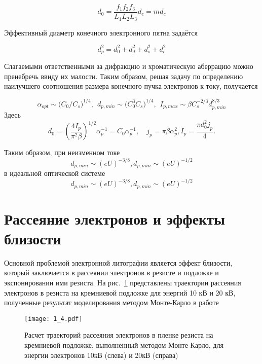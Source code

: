 \begin{equation}
d_0= \frac{f_1 f_2 f_3}{L_1 L_2 L_3} d_c = md_c
\label{eq:A4}
\end{equation}

Эффективный диаметр конечного электронного пятна задаётся

\begin{equation}
d_p^2=d_0^2+d_d^2+d_s^2+d_c^2
\label{eq:A5}
\end{equation}

Слагаемыми ответственными за дифракцию и хроматическую аберрацию можно пренебречь ввиду их малости. Таким образом, решая задачу по определению наилучшего соотношения размера конечного пучка электронов к току, получается

\begin{equation}
\alpha_{opt}\sim{(}C_0/C_s{)}^{1/4},\>\>d_{p,min}\sim{(}C_0^3 C_s{)}^{1/4},\>\> I_{p,max}\sim \beta C_s^{-2/3} d_{p,min}^{8/3}\label{eq:A6}
\end{equation}
Здесь
\[
    d_0= \left(\frac{4I_p}{\pi^2 \beta}\right)^{1/2} \alpha_p^{-1}=C_0\alpha_p^{-1},
    \quad j_p=\pi \beta \alpha_p^2 , I_p= \frac{\pi d_0^2 j_p}{4}.
\]

Таким образом, при неизменном токе
\begin{equation}
d_{p,min}\sim (eU)^{-3/8},d_{p,min}\sim(eU)^{-1/2}
\label{eq:A7}
\end{equation}
в идеальной оптической системе
\begin{equation}
d_{p,min}\sim (eU)^{-3/8},d_{p,min}\sim(eU)^{-1/2}
\end{equation}

\section{Рассеяние электронов и эффекты близости}

Основной проблемой электронной литографии является эффект близости, который заключается в рассеянии электронов в резисте и подложке и экспонировании ими резиста. На рис.~\ref{fig:4} представлены траектории рассеяния электронов в резиста на кремниевой подложке для энергий 10 кВ и 20 кВ, полученные результат моделирования методом Монте-Карло в работе \cite{4}

\begin{figure}[H]
\center
\texttt{[image: 1\_4.pdf]}
\caption{ Расчет траекторий рассеяния электронов в пленке резиста на кремниевой подложке, выполненный методом Монте-Карло, для энергии электронов 10кВ (слева) и 20кВ (справа)}
\label{fig:4}
\end{figure}


